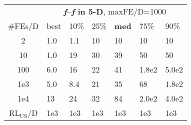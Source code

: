 \begin{tabular}{c|llllll}
 & \multicolumn{6}{|c}{\textbf{\textit{f}\raisebox{-0.35ex}{1}--\textit{f}\raisebox{-0.35ex}{24} in 5-D}, maxFE/D=1000}\\
\#FEs/D & best & 10\% & 25\% & \textbf{med} & 75\% & 90\%\\
2 & \hspace*{1ex}1.0 & \hspace*{1ex}1.1 & 10 & 10 & 10 & 10\\
10 & \hspace*{1ex}1.0 & 19 & 30 & 39 & 50 & 50\\
100 & \hspace*{1ex}6.0 & 16 & 22 & 41 & 1.8e2 & 5.0e2\\
1e3 & \hspace*{1ex}5.0 & \hspace*{1ex}8.4 & 21 & 35 & 68 & 1.8e2\\
1e4 & 13 & 24 & 32 & 84 & 2.0e2 & 4.0e2\\
$\text{RL}_{\text{US}}$/D & 1e3 & 1e3 & 1e3 & 1e3 & 1e3 & 1e3
\end{tabular}
